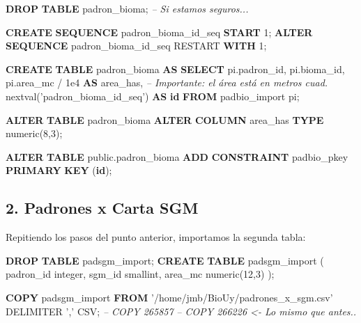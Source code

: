 \documentclass[spanish,]{article}
\newenvironment{Shaded}{}{}
\newcommand{\KeywordTok}[1]{\textcolor[rgb]{0.00,0.44,0.13}{\textbf{{#1}}}}
\newcommand{\DataTypeTok}[1]{\textcolor[rgb]{0.56,0.13,0.00}{{#1}}}
\newcommand{\DecValTok}[1]{\textcolor[rgb]{0.25,0.63,0.44}{{#1}}}
\newcommand{\FloatTok}[1]{\textcolor[rgb]{0.25,0.63,0.44}{{#1}}}
\newcommand{\StringTok}[1]{\textcolor[rgb]{0.25,0.44,0.63}{{#1}}}
\newcommand{\CommentTok}[1]{\textcolor[rgb]{0.38,0.63,0.69}{\textit{{#1}}}}
\newcommand{\NormalTok}[1]{{#1}}
\begin{document}
\begin{Shaded}
\begin{Highlighting}[]
\KeywordTok{DROP} \KeywordTok{TABLE} \NormalTok{padron_bioma; }\CommentTok{-- Si estamos seguros...}
    
\KeywordTok{CREATE} \KeywordTok{SEQUENCE} \NormalTok{padron_bioma_id_seq }\KeywordTok{START} \DecValTok{1}\NormalTok{;}
\KeywordTok{ALTER}  \KeywordTok{SEQUENCE} \NormalTok{padron_bioma_id_seq RESTART }\KeywordTok{WITH} \DecValTok{1}\NormalTok{;}

\KeywordTok{CREATE} \KeywordTok{TABLE} \NormalTok{padron_bioma }\KeywordTok{AS}
\KeywordTok{SELECT}
  \NormalTok{pi.padron_id,}
  \NormalTok{pi.bioma_id,}
  \NormalTok{pi.area_mc / }\FloatTok{1e4} \KeywordTok{AS} \NormalTok{area_has, }\CommentTok{-- Importante: el área está en metros cuad.}
  \NormalTok{nextval(}\StringTok{'padron_bioma_id_seq'}\NormalTok{) }\KeywordTok{AS} \KeywordTok{id}
  \KeywordTok{FROM} \NormalTok{padbio_import pi;}
    
\KeywordTok{ALTER} \KeywordTok{TABLE} \NormalTok{padron_bioma }\KeywordTok{ALTER} \KeywordTok{COLUMN} \NormalTok{area_has }\KeywordTok{TYPE} \DataTypeTok{numeric}\NormalTok{(}\DecValTok{8}\NormalTok{,}\DecValTok{3}\NormalTok{);}
    
\KeywordTok{ALTER} \KeywordTok{TABLE} \NormalTok{public.padron_bioma}
  \KeywordTok{ADD} \KeywordTok{CONSTRAINT} \NormalTok{padbio_pkey }\KeywordTok{PRIMARY} \KeywordTok{KEY} \NormalTok{(}\KeywordTok{id}\NormalTok{);}
\end{Highlighting}
\end{Shaded}

\subsection{2. Padrones x Carta SGM}\label{padrones-x-carta-sgm}

Repitiendo los pasos del punto anterior, importamos la segunda tabla:

\begin{Shaded}
\begin{Highlighting}[]
\KeywordTok{DROP} \KeywordTok{TABLE} \NormalTok{padsgm_import;}
\KeywordTok{CREATE} \KeywordTok{TABLE} \NormalTok{padsgm_import (}
  \NormalTok{padron_id }\DataTypeTok{integer}\NormalTok{,}
  \NormalTok{sgm_id }\DataTypeTok{smallint}\NormalTok{,}
  \NormalTok{area_mc }\DataTypeTok{numeric}\NormalTok{(}\DecValTok{12}\NormalTok{,}\DecValTok{3}\NormalTok{)}
\NormalTok{);}
    
\KeywordTok{COPY} \NormalTok{padsgm_import }\KeywordTok{FROM} \StringTok{'/home/jmb/BioUy/padrones_x_sgm.csv'} \NormalTok{DELIMITER }\StringTok{','} \NormalTok{CSV;}
\CommentTok{-- COPY 265857}
\CommentTok{-- COPY 266226 <- Lo mismo que antes..}
\end{Highlighting}
\end{Shaded}
\end{document}
